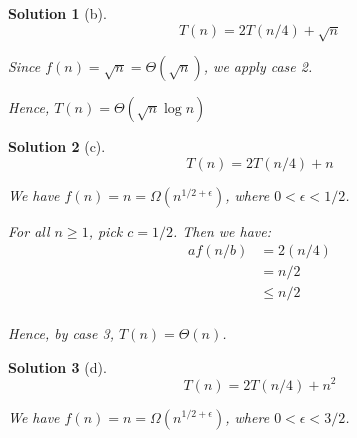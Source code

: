 \documentclass[letterpaper, 11pt]{article}
\theoremstyle{mystyle}
\newtheorem*{sln}{Solution}
\begin{document}
\begin{sln}[b]
    \[T(n) = 2T(n/4) + \sqrt{n}\]

    Since $f(n) = \sqrt{n} = \Theta (\sqrt{n})$, we apply case 2.

    Hence, $T(n) = \Theta (\sqrt{n} \log n)$
\end{sln}

\begin{sln}[c]
    \[T(n) = 2T(n/4) + n\]

    We have $f(n) = n = \Omega (n^{1/2+\epsilon})$, where $0 <\epsilon < 1/2$. 

    For all $n \geq 1$, pick $c = 1/2$. Then we have:
    \begin{align*}
        af(n/b) & = 2(n/4) \\
                & = n/2 \\
                & \leq n/2 \\
    \end{align*}

    Hence, by case 3, $T(n) = \Theta(n)$.
\end{sln}

\begin{sln}[d]
    \[T(n) = 2T(n/4) + n^2 \]

    We have $f(n) = n = \Omega (n^{1/2+\epsilon})$, where $0 <\epsilon < 3/2$. 
\end{sln}
\end{document}
